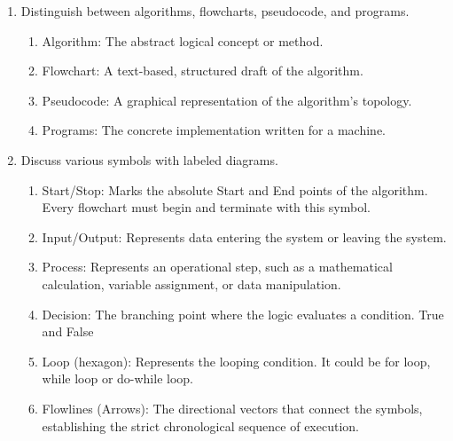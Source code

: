 \documentclass[11pt, a4paper]{article}
\begin{document}
\begin{enumerate}
\begin{enumerate}
\item Effectiveness: Every operation must be basic enough that it could, in principle, be carried out exactly and in a finite amount of time using just pen and paper.
  \end{enumerate}
   Algorithms are important as they provide a standardized, language-agnostic way to solve problems efficiently.
  \item Distinguish between algorithms, flowcharts, pseudocode, and programs.
  \begin{enumerate}
    \item Algorithm: The abstract logical concept or method.
    \item Flowchart: A text-based, structured draft of the algorithm.
    \item Pseudocode: A graphical representation of the algorithm's topology.
    \item Programs: The concrete implementation written for a machine.
  \end{enumerate}
  \item Discuss various symbols with labeled diagrams.
  \begin{enumerate}
    \item Start/Stop: Marks the absolute Start and End points of the algorithm. Every flowchart must begin and terminate with this symbol.
    \item Input/Output: Represents data entering the system or leaving the system.
    \item Process: Represents an operational step, such as a mathematical calculation, variable assignment, or data manipulation.
    \item Decision: The branching point where the logic evaluates a condition. True and False
    \item Loop (hexagon): Represents the looping condition. It could be for loop, while loop or do-while loop.
    \item Flowlines (Arrows): The directional vectors that connect the symbols, establishing the strict chronological sequence of execution.
  \end{enumerate}
\end{enumerate}
\end{document}
